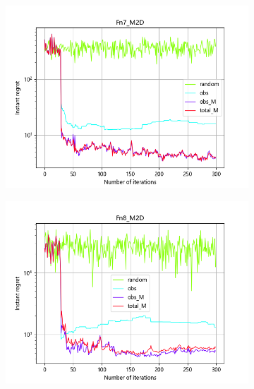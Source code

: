 \documentclass{article}
\begin{document}
\begin{figure}[H]
\begin{subfigure}[t]{.32\linewidth}
        \includegraphics[width=1\textwidth]{pictures/Homo_noise_2D/M/Fn7_M2D_ins.png}
    \end{subfigure}
    \begin{subfigure}[t]{.32\linewidth}
        \centering
        \includegraphics[width=1\textwidth]{pictures/Homo_noise_2D/M/Fn8_M2D_ins.png}
    \end{subfigure}
    \begin{subfigure}[t]{.32\linewidth}
        \centering

\end{subfigure}
\end{figure}
\end{document}
